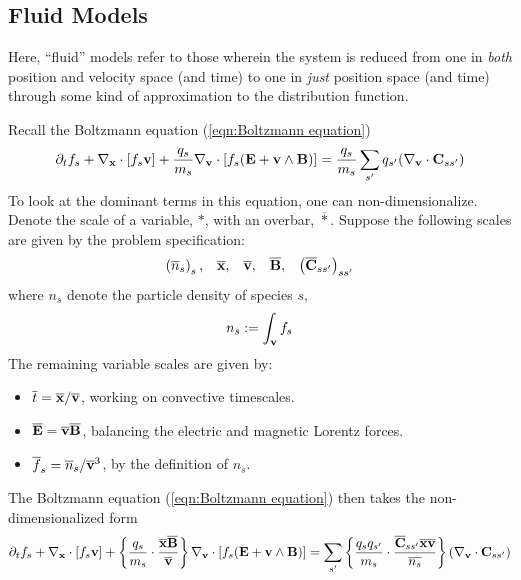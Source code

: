 \subsection*{Fluid Models}
    \noindent\makebox[\linewidth]{\rule{\textwidth}{0.4pt}}
    \begin{definition}
        Here, ``fluid'' models refer to those wherein the system is reduced from one in \emph{both} position and velocity space (and time) to one in \emph{just} position space (and time) through some kind of approximation to the distribution function.
    \end{definition}
    \noindent\makebox[\linewidth]{\rule{\textwidth}{0.4pt}}
    Recall the Boltzmann equation (\ref{eqn:Boltzmann equation})
    \begin{equation*}
        \partial_{t}f_{s} + \nabla_{\mathbf{x}}\cdot[f_{s}\mathbf{v}] + \frac{q_{s}}{m_{s}}\nabla_{\mathbf{v}}\cdot[f_{s}(\mathbf{E} + \mathbf{v}\wedge\mathbf{B})]  =  \frac{q_{s}}{m_{s}}\sum_{s'}q_{s'}(\nabla_{\mathbf{v}}\cdot\mathbf{C}_{ss'})
    \end{equation*}
    To look at the dominant terms in this equation, one can non-dimensionalize. Denote the scale of a variable, $*$, with an overbar, $\overline{*}$. Suppose the following scales are given by the problem specification:
    \begin{align}
        \left(\overline{n}_{s}\right)_{s},        &&
        \overline{\mathbf{x}},                          &&
        \overline{\mathbf{v}},                          &&
        \overline{\mathbf{B}},                          &&
        \left(\overline{\mathbf{C}}_{ss'}\right)_{ss'}
    \end{align}
    where $n_{s}$ denote the particle density of species $s$,
    \begin{equation}
        n_{s}  :=  \int_{\mathbf{v}}f_{s}
    \end{equation}
    The remaining variable scales are given by:
    \begin{itemize}
        \item  $\overline{t}      =  \overline{\mathbf{x}}/\overline{\mathbf{v}}$, working on convective timescales.
        \item  $\overline{\mathbf{E}}   =  \overline{\mathbf{v}}\overline{\mathbf{B}}$, balancing the electric and magnetic Lorentz forces. 
        \item  $\overline{f}_{s}  =  \overline{n}_{s}/\overline{\mathbf{v}}^{3}$, by the definition of $n_{s}$.
    \end{itemize}
    
    The Boltzmann equation (\ref{eqn:Boltzmann equation}) then takes the non-dimensionalized form
    \begin{equation}
        \partial_{t}f_{s} + \nabla_{\mathbf{x}}\cdot[f_{s}\mathbf{v}] + \left\{\frac{q_{s}}{m_{s}}\cdot\frac{\overline{\mathbf{x}}\overline{\mathbf{B}}}{\overline{\mathbf{v}}}\right\}\nabla_{\mathbf{v}}\cdot[f_{s}(\mathbf{E} + \mathbf{v}\wedge\mathbf{B})]  =  \sum_{s'}\left\{\frac{q_{s}q_{s'}}{m_{s}}\cdot\frac{\overline{\mathbf{C}}_{ss'}\overline{\mathbf{x}}\overline{\mathbf{v}}}{\overline{n_{s}}}\right\}(\nabla_{\mathbf{v}}\cdot\mathbf{C}_{ss'})
    \end{equation}
    
